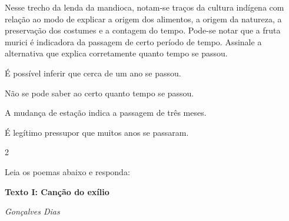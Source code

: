 
Nesse trecho da lenda da mandioca, notam-se traços da cultura
indígena com relação ao modo de explicar a origem dos alimentos, a
origem da natureza, a preservação dos costumes e a contagem do tempo.
Pode-se notar que a fruta murici é indicadora da passagem de certo 
período de tempo. Assinale a alternativa que explica corretamente 
quanto tempo se passou.

\begin{escolha}

  \item É possível inferir que cerca de um ano se passou.
  
  \item Não se pode saber ao certo quanto tempo se passou.
  
  \item A mudança de estação indica a passagem de três meses.  
  
  \item É legítimo pressupor que muitos anos se passaram. 

\end{escolha}


\num{2}

Leia os poemas abaixo e responda:

\textbf{Texto I: Canção do exílio}

\emph{Gonçalves Dias}

